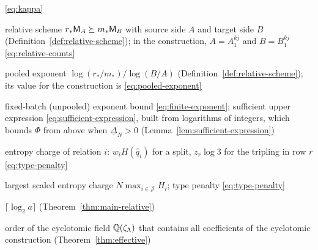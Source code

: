 {\begin{list}{}
 \eqref{eq:kappa}
\item[\(r_*\), \(m_*\), \(A\), \(B\)] relative scheme
 \(r_*\mathsf M_A\succeq m_*\mathsf M_B\) with source side \(A\) and target side
 \(B\) (Definition~\ref{def:relative-scheme}); in the construction,
 \(A=A_1^{kj}\) and \(B=B_1^{kj}\) \eqref{eq:relative-counts}
\item[\(p\)] pooled exponent \(\log(r_*/m_*)/\log(B/A)\)
 (Definition~\ref{def:relative-scheme}); its value for the construction
 is \eqref{eq:pooled-exponent}
\item[\(\Phi\), \(\overline\Phi\)] fixed-batch (unpooled) exponent bound
 \eqref{eq:finite-exponent}; sufficient upper expression
 \eqref{eq:sufficient-expression}, built from logarithms of integers, which
 bounds \(\Phi\) from above when \(\underline\Delta_N>0\)
 (Lemma~\ref{lem:sufficient-expression})
\item[\(H_i\)] entropy charge of relation \(i\): \(w_iH(\hat q_i)\) for a
 split, \(z_r\log3\) for the tripling in row \(r\)
 \eqref{eq:type-penalty}
\item[\(\bar H_N\), \(\mathcal T_N\)] largest scaled entropy charge
 \(N\max_{i\in\mathcal J}H_i\); type penalty \eqref{eq:type-penalty}
\item[\(\ell_a\)] \(\lceil\log_2a\rceil\) (Theorem~\ref{thm:main-relative})
\item[\(\Lambda\)] order of the cyclotomic field \(\mathbb Q(\zeta_\Lambda)\)
 that contains all coefficients of the cyclotomic construction
 (Theorem~\ref{thm:effective})
\end{list}
\par}
